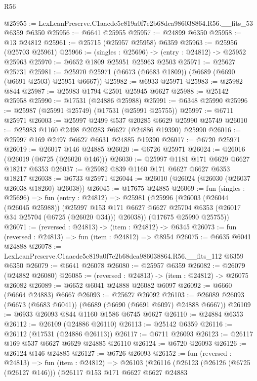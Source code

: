 \begin{lexlean}{R56}
\begin{coremodule}
@25955 := LexLeanPreserve.C1aacde5c819a0f7e2b68dca986038864.R56.__fits_53 @6359 @6350
@25956 := @6641 @25955
@25957 := @24899 @6350
@25958 := @13 @24812
@25961 := @25715 (@25957 @25958) @6359
@25963 := @25956 (@25703 @25961)
@25966 := (singles : @25696) -> (entry : @24812) -> @25952 @25963
@25970 := @6652 @1809 @25951 @25963 @2503
@25971 := @25627 @25731
@25981 := @25970 @25971 (@6673 (@6683 @1809)) (@6689 (@6690 (@6691 @2503) @25951 @6667))
@25982 := @6933 @25971
@25983 := @25982 @844
@25987 := @25983 @1794 @2501 @25945 @6627
@25988 := @25142 @25958
@25990 := @17531 (@24886 @25988)
@25991 := @6348 @25990
@25996 := @25987 (@25991 @25749) (@17531 (@25991 @25755))
@25997 := @6711 @25971
@26003 := @25997 @2499 @537 @20285 @6629 @25990 @25749
@26010 := @25983 @1160 @2498 @20283 @6627 (@24886 @19390) @25990
@26016 := @25997 @169 @2497 @6627 @6631 @24885 @19390
@26017 := @6720 @25971
@26019 := @26017 @146 @24885
@26020 := @6726 @25971
@26024 := @26016 (@26019 (@6725 (@26020 @146)))
@26030 := @25997 @1181 @171 @6629 @6627 @18217 @6353
@26037 := @25982 @839 @1160 @171 @6627 @6627 @6353 @18217
@26038 := @6733 @25971
@26044 := @26010 (@26024 (@26030 (@26037 @26038 @18260) @26038))
@26045 := @17675 @24885
@26069 := fun (singles : @25696) =>
  fun (entry : @24812) =>
  @25981
    (@25996
      (@26003
        (@26044 (@26045 @25988))
        (@25997 @153 @171 @6627 @6627 @25704 @6353 (@26017 @34 @25704 (@6725 (@26020 @34))) @26038))
      (@17675 @25990 @25755))
@26071 := (reversed : @24813) -> (item : @24812) -> @6345
@26073 := fun (reversed : @24813) => fun (item : @24812) => @8954
@26075 := @6635 @6041 @24888
@26078 := LexLeanPreserve.C1aacde5c819a0f7e2b68dca986038864.R56.__fits_112 @6359 @6350
@26079 := @6641 @26078
@26080 := @25957 @6359
@26082 := @26079 (@24882 @26080)
@26085 := (reversed : @24813) -> (item : @24812) -> @26075 @26082
@26089 := @6652 @6041 @24888 @26082 @6097
@26092 := @6660 (@6664 @24883) @6667
@26093 := @25627 @26092
@26103 := @26089 @26093 (@6673 (@6683 @6041)) (@6689 (@6690 (@6691 @6097) @24888 @6667))
@26109 := @6933 @26093 @844 @1160 @1586 @6745 @6627
@26110 := @24884 @6353
@26112 := @26109 (@24886 @26110)
@26113 := @25142 @6359
@26116 := @26112 (@17531 (@24886 @26113))
@26117 := @6711 @26093
@26123 := @26117 @169 @537 @6627 @6629 @24885 @26110
@26124 := @6720 @26093
@26126 := @26124 @146 @24885
@26127 := @6726 @26093
@26152 := fun (reversed : @24813) =>
  fun (item : @24812) =>
  @26103
    (@26116
      (@26123
        (@26126 (@6725 (@26127 @146)))
        (@26117
          @153
          @171
          @6627
          @6627
          @24883

\end{coremodule}
\end{lexlean}
